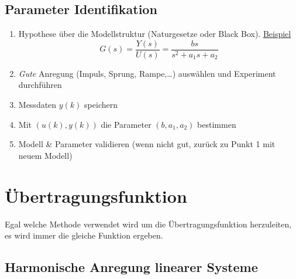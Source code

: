 \documentclass[
  10pt,
  a4paper,
]{article}
\providecommand{\tightlist}{%
  \setlength{\itemsep}{0pt}\setlength{\parskip}{0pt}}\usepackage{longtable,booktabs,array}
\numberwithin{equation}{section}
\begin{document}
\begin{multicols}{2}
\hypertarget{parameter-identifikation}{%
\subsection{Parameter Identifikation}\label{parameter-identifikation}}

\begin{enumerate}
\def\labelenumi{\arabic{enumi}.}
\tightlist
\item
  Hypothese über die Modellstruktur (Naturgesetze oder Black Box).
  \ul{Beispiel} \[
  G(s)=\frac{Y(s)}{U(s)}=\frac{bs}{s^2+a_1s+a_2}
  \]
\item
  \emph{Gute} Anregung (Impuls, Sprung, Rampe,\ldots) auswählen und
  Experiment durchführen
\item
  Messdaten \(y(k)\) speichern
\item
  Mit \((u(k), y(k))\) die Parameter \((b, a_1, a_2)\) bestimmen
\item
  Modell \& Parameter validieren (wenn nicht gut, zurück zu Punkt 1 mit
  neuem Modell)
\end{enumerate}

\hypertarget{uxfcbertragungsfunktion-2}{%
\section{Übertragungsfunktion}\label{uxfcbertragungsfunktion-2}}

\begin{tcolorbox}[enhanced jigsaw, coltitle=black, arc=.35mm, breakable, opacityback=0, opacitybacktitle=0.6, rightrule=.15mm, titlerule=0mm, bottomrule=.15mm, leftrule=.75mm, bottomtitle=1mm, colframe=quarto-callout-important-color-frame, toprule=.15mm, colbacktitle=quarto-callout-important-color!10!white, toptitle=1mm, title=\textcolor{quarto-callout-important-color}{\faExclamation}\hspace{0.5em}{Wichtig}, left=2mm, colback=white]

Egal welche Methode verwendet wird um die Übertragungsfunktion
herzuleiten, es wird immer die gleiche Funktion ergeben.

\end{tcolorbox}

\hypertarget{harmonische-anregung-linearer-systeme}{%
\subsection{Harmonische Anregung linearer
Systeme}\label{harmonische-anregung-linearer-systeme}}


\end{multicols}
\end{document}
